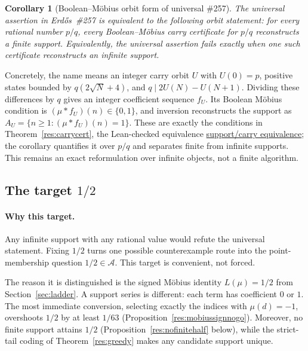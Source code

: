 \documentclass[11pt]{article}
\newcommand{\commit}{ebc98ee71f6819bd9fe344a0bb343542c604e533}
\newcommand{\repobase}{https://github.com/wcook04/plectis-lean-erdos249-257/blob/\commit}
\newcommand{\PK}{Erdos249257}
\newcommand{\lword}[4]{\href{\repobase/\PK/#1\#L#2}{#4}}
\newtheorem{corollary}[theorem]{Corollary}
\theoremstyle{definition}
\theoremstyle{remark}
\begin{document}
\begin{corollary}[Boolean--M\"obius orbit form of universal \#257]
\label{res:universal-boolean-obstruction}
The universal assertion in Erd\H{o}s~\#257 is equivalent to the following
orbit statement: for every rational number \(p/q\), every
Boolean--M\"obius carry certificate for \(p/q\) reconstructs a finite
support.  Equivalently, the universal assertion fails exactly when one such
certificate reconstructs an infinite support.
\end{corollary}
\noindent Concretely, the name means an integer carry orbit \(U\) with
\(U(0)=p\), positive states bounded by \(q(2\sqrt N+4)\), and
\(q\mid 2U(N)-U(N+1)\).  Dividing these differences by \(q\) gives an
integer coefficient sequence \(f_U\).  Its Boolean M\"obius condition is
\((\mu*f_U)(n)\in\{0,1\}\), and inversion reconstructs the support as
\(A_U=\{n\geq1:(\mu*f_U)(n)=1\}\).  These are exactly the conditions in
Theorem~\ref{res:carrycert}, the Lean-checked equivalence
\lword{BooleanMobiusCarry.lean}{948}{exists_normalized_support_fraction_iff_exists_booleanMobiusCarry}{support/carry equivalence};
the corollary quantifies it over \(p/q\) and separates finite from infinite
supports.  This remains an exact reformulation over infinite objects, not a
finite algorithm.

\subsection{The target \(1/2\)}

\paragraph{Why this target.}
Any infinite support with any rational value would refute the universal
statement.  Fixing \(1/2\) turns one possible counterexample route into the
point-membership question \(1/2\in\mathcal A\).  This target is convenient,
not forced.

The reason it is distinguished is the signed M\"obius identity
\(L(\mu)=1/2\) from Section~\ref{sec:ladder}.  A support series is different:
each term has coefficient \(0\) or \(1\).  The most immediate conversion,
selecting exactly the indices with \(\mu(d)=-1\), overshoots \(1/2\) by at
least \(1/63\) (Proposition~\ref{res:mobiussignnogo}).  Moreover, no finite
support attains \(1/2\) (Proposition~\ref{res:nofinitehalf} below), while the
strict-tail coding of Theorem~\ref{res:greedy} makes any candidate support
unique.
\end{document}

